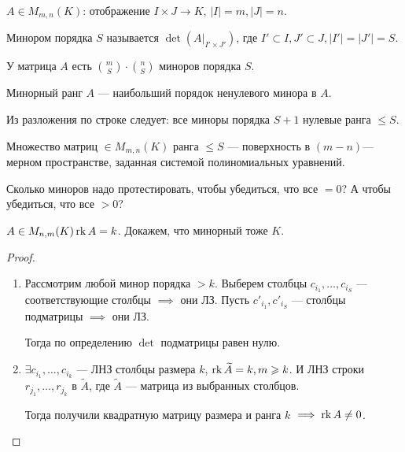 \begin{definition}
    $A \in M_{m, n}(K)$: отображение  $I \times J \to K$,  $|I| = m, |J| = n$.

    Минором порядка  $S$ называется  $\det (A\Big|_{I' \times J'})$, где  $I' \subset I, J' \subset J, |I'| = |J'| = S$.

    У матрица  $A$ есть  $\binom{m}{S} \cdot \binom{n}{S}$ миноров порядка  $S$.
\end{definition}
\begin{definition}
    Минорный ранг $A$ --- наибольший порядок ненулевого минора в  $A$.
\end{definition}
\begin{remark}
    Из разложения по строке следует: все миноры порядка $S+1$ нулевые ранга  $\le S$.
\end{remark}
\begin{consequence}
    Множество матриц $\in M_{m, n}(K)$ ранга  $\le S$ --- поверхность в $(m-n)$---мерном пространстве, заданная системой полиномиальных уравнений.
\end{consequence}
\begin{exerc}
    Сколько миноров надо протестировать, чтобы убедиться, что все $=0$? А чтобы убедиться, что все  $> 0$?
\end{exerc}
\begin{theorem}
    $A \in M_{n, m}(K) \operatorname{rk} A = k$. Докажем, что минорный тоже  $K$.
\end{theorem}
\begin{proof}
    \slashn
    \begin{enumerate}
        \item Рассмотрим любой минор порядка $>k$. Выберем столбцы  $c_{i_1}, \ldots, c_{i_S}$ --- соответствующие столбцы $\implies$ они ЛЗ.  Пусть $c'_{i_1}, c'_{i_S}$ --- столбцы подматрицы $\implies$ они ЛЗ.

            Тогда по определению  $\det $ подматрицы равен нулю.
        \item $\exists c_{i_1}, \ldots, c_{i_k}$ --- ЛНЗ столбцы размера $k$,  $\operatorname{rk} \widetilde{A} = k, m \geqslant k$. И ЛНЗ строки $r_{j_1}, \ldots, r_{j_k}$ в $\widetilde{A}$, где $\widetilde{A}$ --- матрица из выбранных столбцов. 

            Тогда получили квадратную матрицу размера и ранга  $k$  $\implies \operatorname{rk} A \neq 0$.
    \end{enumerate}
\end{proof}

